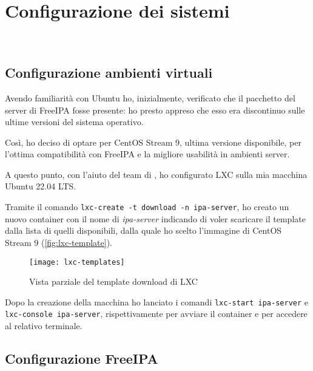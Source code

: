 
\chapter{Configurazione dei sistemi}
\label{cap:configurazione-sistemi}

\\

\section{Configurazione ambienti virtuali}

Avendo familiarità con Ubuntu ho, inizialmente, verificato che il pacchetto del server di FreeIPA fosse presente: ho presto appreso che esso era discontinuo sulle ultime versioni del sistema operativo.

Così, ho deciso di optare per CentOS Stream 9, ultima versione disponibile, per l'ottima compatibilità con FreeIPA e la migliore usabilità in ambienti server.

A questo punto, con l'aiuto del team di \myAzienda, ho configurato LXC sulla mia macchina Ubuntu 22.04 LTS. 

Tramite il comando \texttt{lxc-create -t download -n ipa-server}, ho creato un nuovo container con il nome di \emph{ipa-server} indicando di voler scaricare il template dalla lista di quelli disponibili, dalla quale ho scelto l'immagine di CentOS Stream 9 (\autoref{fig:lxc-template}).

\begin{figure}[!h] 
    \centering 
    \texttt{[image: lxc-templates]} 
    \caption{Vista parziale del template download di LXC}
    \label{fig:lxc-template}
\end{figure}

Dopo la creazione della macchina ho lanciato i comandi \texttt{lxc-start ipa-server} e \texttt{lxc-console ipa-server}, rispettivamente per avviare il container e per accedere al relativo terminale.

\section{Configurazione FreeIPA}

